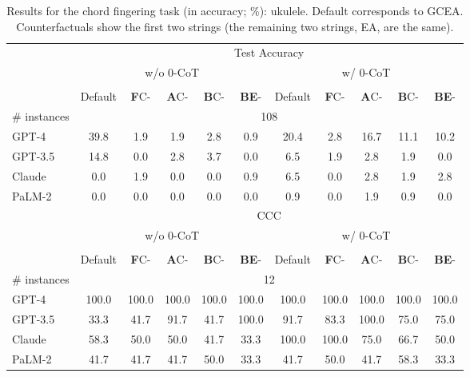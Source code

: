 \begin{table}[t!]
    \centering
    \footnotesize
    \begin{tabular}{lcccccccccc}
    \toprule 
     & \multicolumn{10}{c}{Test Accuracy} \\ \cmidrule(lr){2-11}
     & \multicolumn{5}{c}{w/o 0-CoT} & \multicolumn{5}{c}{w/ 0-CoT} \\
     \cmidrule(lr){2-6} \cmidrule(lr){7-11} \\
     & Default & \textbf{F}C- & \textbf{A}C- & \textbf{B}C- & \textbf{BE}-& Default & \textbf{F}C- & \textbf{A}C- & \textbf{B}C- & \textbf{BE}- \\
     \midrule
     \# instances & \multicolumn{10}{c}{108} \\
    \midrule
    GPT-4 & 39.8 & 1.9 & 1.9 & 2.8 & 0.9 & 20.4 & 2.8 & 16.7 & 11.1 & 10.2\\
    GPT-3.5 & 14.8 & 0.0 & 2.8 & 3.7 & 0.0 & 6.5 & \phantom{0}1.9 & \phantom{0}2.8 & \phantom{0}1.9 & \phantom{0}0.0\\
    Claude & \phantom{0}0.0 & 1.9 & 0.0 & 0.0 & 0.9 & 6.5 & \phantom{0}0.0 & \phantom{0}2.8 & \phantom{0}1.9 & \phantom{0}2.8\\
    PaLM-2 & \phantom{0}0.0 & 0.0 & 0.0 & 0.0 & 0.0 & 0.9 & \phantom{0}0.0 & \phantom{0}1.9 & \phantom{0}0.9 & \phantom{0}0.0\\
    \midrule
     & \multicolumn{10}{c}{CCC} \\ \cmidrule(lr){2-11} & \multicolumn{5}{c}{w/o 0-CoT} & \multicolumn{5}{c}{w/ 0-CoT} \\
     \cmidrule(lr){2-6} \cmidrule(lr){7-11} \\
      & Default & \textbf{F}C- & \textbf{A}C- & \textbf{B}C- & \textbf{BE}-& Default & \textbf{F}C- & \textbf{A}C- & \textbf{B}C- & \textbf{BE}- \\
     \midrule
     \# instances & \multicolumn{10}{c}{12} \\
    \midrule
    GPT-4 & 100.0 & 100.0 & 100.0 & 100.0 & 100.0 & 100.0 & 100.0 & 100.0 & 100.0 & 100.0\\
    GPT-3.5 & \phantom{0}33.3 & \phantom{0}41.7 & \phantom{0}91.7 & \phantom{0}41.7 & 100.0 & \phantom{0}91.7 & \phantom{0}83.3 & 100.0 & \phantom{0}75.0 & \phantom{0}75.0 \\
    Claude & \phantom{0}58.3 & \phantom{0}50.0 & \phantom{0}50.0 & \phantom{0}41.7 & \phantom{0}33.3 & 100.0 & 100.0 & \phantom{0}75.0 & \phantom{0}66.7 & \phantom{0}50.0\\
    PaLM-2 & \phantom{0}41.7 & \phantom{0}41.7 & \phantom{0}41.7 & \phantom{0}50.0 & \phantom{0}33.3 & \phantom{0}41.7 & \phantom{0}50.0 & \phantom{0}41.7 & \phantom{0}58.3 & \phantom{0}33.3\\
    \bottomrule
    \end{tabular}
    \caption{Results for the chord fingering task (in accuracy; \%): ukulele. Default corresponds to GCEA. Counterfactuals show the first two strings (the remaining two strings, EA, are the same).
    }
\end{table}





